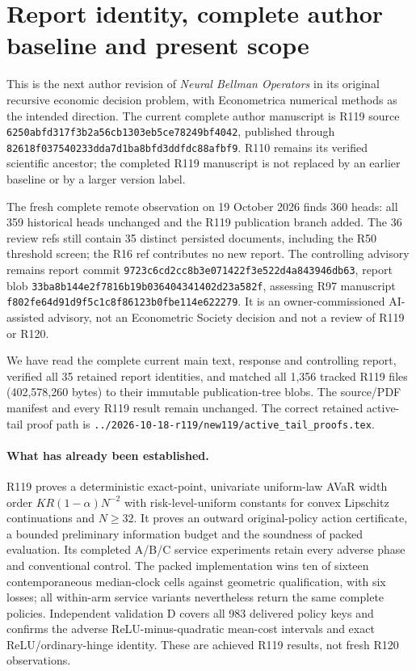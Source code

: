 \section{Report identity, complete author baseline and present scope}
This is the next author revision of \emph{Neural Bellman Operators} in its original recursive economic decision problem, with Econometrica numerical methods as the intended direction. The current complete author manuscript is R119 source \nolinkurl{6250abfd317f3b2a56cb1303eb5ce78249bf4042}, published through \nolinkurl{82618f037540233dda7d1ba8bfd3ddfdc88afbf9}. R110 remains its verified scientific ancestor; the completed R119 manuscript is not replaced by an earlier baseline or by a larger version label.

The fresh complete remote observation on 19 October 2026 finds 360 heads: all 359 historical heads unchanged and the R119 publication branch added. The 36 review refs still contain 35 distinct persisted documents, including the R50 threshold screen; the R16 ref contributes no new report. The controlling advisory remains report commit \nolinkurl{9723c6cd2cc8b3e071422f3e522d4a843946db63}, report blob \nolinkurl{33ba8b144e2f7816b19b036404341402d23a582f}, assessing R97 manuscript \nolinkurl{f802fe64d91d9f5c1c8f86123b0fbe114e622279}. It is an owner-commissioned AI-assisted advisory, not an Econometric Society decision and not a review of R119 or R120.

We have read the complete current main text, response and controlling report, verified all 35 retained report identities, and matched all 1,356 tracked R119 files (402,578,260 bytes) to their immutable publication-tree blobs. The source/PDF manifest and every R119 result remain unchanged. The correct retained active-tail proof path is \nolinkurl{../2026-10-18-r119/new119/active_tail_proofs.tex}.

\paragraph{What has already been established.}
R119 proves a deterministic exact-point, univariate uniform-law AVaR width order $KR(1-\alpha)N^{-2}$ with risk-level-uniform constants for convex Lipschitz continuations and $N\ge32$. It proves an outward original-policy action certificate, a bounded preliminary information budget and the soundness of packed evaluation. Its completed A/B/C service experiments retain every adverse phase and conventional control. The packed implementation wins ten of sixteen contemporaneous median-clock cells against geometric qualification, with six losses; all within-arm service variants nevertheless return the same complete policies. Independent validation D covers all 983 delivered policy keys and confirms the adverse ReLU-minus-quadratic mean-cost intervals and exact ReLU/ordinary-hinge identity. These are achieved R119 results, not fresh R120 observations.

